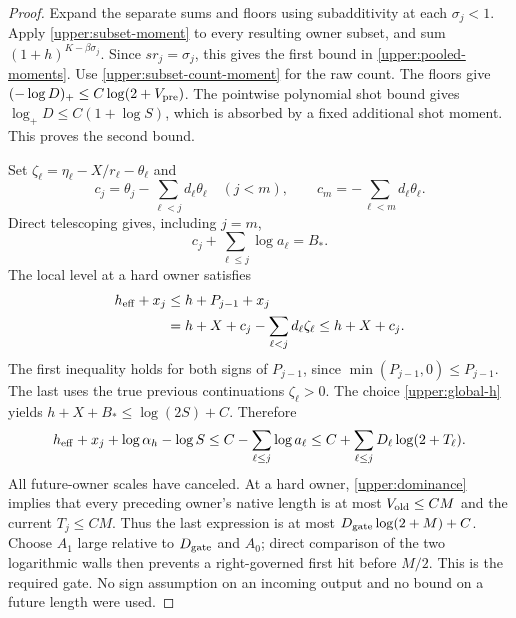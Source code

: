 \begin{proof}
Expand the separate sums and floors using subadditivity at each
$\sigma_j<1$.  Apply \eqref{upper:subset-moment} to every resulting
owner subset, and sum $(1+h)^{K-\beta\sigma_j}$.  Since
$sr_j=\sigma_j$, this gives the first bound in
\eqref{upper:pooled-moments}.  Use
\eqref{upper:subset-count-moment} for the raw count.  The floors give
$(-\log D)_+\leq C\log(2+V_{\rm pre})$.  The pointwise polynomial
shot bound gives $\log_+D\leq C(1+\log S)$, which is absorbed by a
fixed additional shot moment.  This proves the second bound.

Set $\zeta_\ell=\eta_\ell-X/r_\ell-\theta_\ell$ and
\begin{equation}
 c_j=\theta_j-\sum_{\ell<j}d_\ell\theta_\ell\quad(j<m),
 \qquad c_m=-\sum_{\ell<m}d_\ell\theta_\ell.
 \label{upper:offsets}
\end{equation}
Direct telescoping gives, including $j=m$,
\begin{equation}
 c_j+\sum_{\ell\leq j}\log a_\ell=B_*.
 \label{upper:offset-cancellation}
\end{equation}
The local level at a hard owner satisfies
\begin{align}
 h_{\rm eff}+x_j
 &\leq h+P_{j-1}+x_j\notag\\
 &=h+X+c_j-\sum_{\ell<j}d_\ell\zeta_\ell
 \leq h+X+c_j.
 \label{upper:gate-private-cancellation}
\end{align}
The first inequality holds for both signs of $P_{j-1}$, since
$\min(P_{j-1},0)\leq P_{j-1}$.  The last uses the true previous
continuations $\zeta_\ell>0$.  The choice
\eqref{upper:global-h} yields $h+X+B_*\leq\log(2S)+C$.
Therefore
\begin{equation}
 h_{\rm eff}+x_j+\log\alpha_h-\log S
 \leq C-\sum_{\ell\leq j}\log a_\ell
 \leq C+\sum_{\ell\leq j}D_\ell\log(2+T_\ell).
 \label{upper:gate-past-only}
\end{equation}
All future-owner scales have canceled.  At a hard owner,
\eqref{upper:dominance} implies that every preceding owner's native
length is at most $V_{\rm old}\leq CM$ and the current $T_j\leq CM$.
Thus the last expression is at most $D_{\rm gate}\log(2+M)+C$.
Choose $A_1$ large relative to $D_{\rm gate}$ and $A_0$; direct
comparison of the two logarithmic walls then prevents a right-governed
first hit before $M/2$.  This is the required gate.  No sign assumption
on an incoming output and no bound on a future length were used.
\end{proof}

